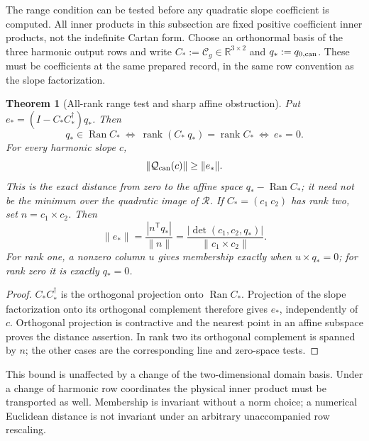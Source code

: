 \documentclass[11pt]{article}
\newtheorem{theorem}{Theorem}[section]
\numberwithin{equation}{section}
\theoremstyle{definition}
\theoremstyle{remark}
\newcommand{\rank}{\operatorname{rank}}
\newcommand{\Ran}{\operatorname{Ran}}
\begin{document}
The range condition can be tested before any quadratic slope coefficient is
computed.  All inner products in this subsection are fixed positive
coefficient inner products, not the indefinite Cartan form.  Choose an
orthonormal basis of the three harmonic output rows and write
$C_*:=\mathcal C_g\in\mathbb R^{3\times2}$ and
$q_*:=q_{0,\rm can}$.  These must be coefficients at the same prepared
record, in the same row convention as the slope factorization.

\begin{theorem}[All-rank range test and sharp affine obstruction]
\label{thm:supp-finite-range-test}
Put $e_*=(I-C_*C_*^\dagger)q_*$.  Then
\begin{equation}
 q_*\in\Ran C_*\ \Longleftrightarrow\
 \rank(C_*\ q_*)=\rank C_*\ \Longleftrightarrow\ e_*=0.
 \label{eq:supp-finite-range-test}
\end{equation}
For every harmonic slope $c$,
\begin{equation}
 \|\mathcal Q_{\rm can}(c)\|\ge\|e_*\|.
 \label{eq:supp-finite-range-floor}
\end{equation}
This is the exact distance from zero to the affine space
$q_*-\Ran C_*$; it need not be the minimum over the quadratic image of
$\mathscr R$.  If $C_*=(c_1\ c_2)$ has rank two, set
$n=c_1\times c_2$.  Then
\begin{equation}
 \|e_*\|=\frac{|n^{\mathsf T}q_*|}{\|n\|}
 =\frac{|\det(c_1,c_2,q_*)|}{\|c_1\times c_2\|}.
 \label{eq:supp-finite-range-distance}
\end{equation}
For rank one, a nonzero column $u$ gives membership exactly when
$u\times q_*=0$; for rank zero it is exactly $q_*=0$.
\end{theorem}
\begin{proof}
$C_*C_*^\dagger$ is the orthogonal projection onto $\Ran C_*$.  Projection
of the slope factorization onto its orthogonal complement therefore gives
$e_*$, independently of $c$.  Orthogonal projection is contractive and the
nearest point in an affine subspace proves the distance assertion.  In rank
two its orthogonal complement is spanned by $n$; the other cases are the
corresponding line and zero-space tests.
\end{proof}

This bound is unaffected by a change of the two-dimensional domain basis.
Under a change of harmonic row coordinates the physical inner product must
be transported as well.  Membership is invariant without a norm choice;
a numerical Euclidean distance is not invariant under an arbitrary
unaccompanied row rescaling.
\end{document}
